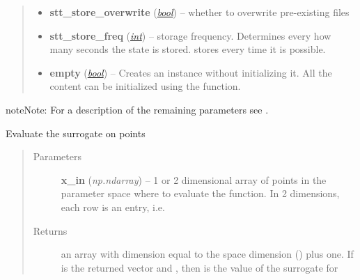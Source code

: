 \documentclass[a4paper,10pt,english]{sphinxmanual}
\begin{document}
\begin{fulllineitems}
\begin{quote}
\begin{description}
\begin{itemize}
\item {} 
\textbf{stt\_store\_overwrite} (\href{http://docs.python.org/library/functions.html\#bool}{\emph{bool}}) -- whether to overwrite pre-existing files

\item {} 
\textbf{stt\_store\_freq} (\href{http://docs.python.org/library/functions.html\#int}{\emph{int}}) -- storage frequency. Determines every how many seconds the state is stored.  stores every time it is possible.

\item {} 
\textbf{empty} (\href{http://docs.python.org/library/functions.html\#bool}{\emph{bool}}) -- Creates an instance without initializing it. All the content can be initialized using the  function.

\end{itemize}

\end{description}\end{quote}

\begin{notice}{note}{Note:}
For a description of the remaining parameters see {\hyperref[api-ttvec:TensorToolbox.core.TTvec]{}}.
\end{notice}

\begin{fulllineitems}
\label{api-core:TensorToolbox.core.SQTT.__getitem__}
\end{fulllineitems}


\begin{fulllineitems}
\label{api-core:TensorToolbox.core.SQTT.__call__}
Evaluate the surrogate on points 
\begin{quote}\begin{description}
\item[{Parameters}] \leavevmode
\textbf{x\_in} (\emph{np.ndarray}) -- 1 or 2 dimensional array of points in the parameter space where to evaluate the function. In 2 dimensions, each row is an entry, i.e. 

\item[{Returns}] \leavevmode
an array with dimension equal to the space dimension () plus one. If  is the returned vector and , then  is the value of the surrogate for 

\end{description}\end{quote}

\end{fulllineitems}


\end{fulllineitems}
\end{document}
